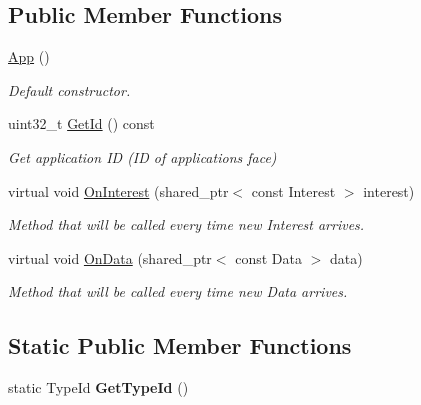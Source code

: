 \subsection*{Public Member Functions}
\begin{DoxyCompactItemize}
\item 
\hyperlink{classns3_1_1ndn_1_1App_aaedddf331628139511f33bdaef6cb7e7}{App} ()\hypertarget{classns3_1_1ndn_1_1App_aaedddf331628139511f33bdaef6cb7e7}{}\label{classns3_1_1ndn_1_1App_aaedddf331628139511f33bdaef6cb7e7}

\begin{DoxyCompactList}\small\item\em Default constructor. \end{DoxyCompactList}\item 
uint32\+\_\+t \hyperlink{classns3_1_1ndn_1_1App_a8fde2d80f8bb09b8e4a233ef733dc8e8}{Get\+Id} () const\hypertarget{classns3_1_1ndn_1_1App_a8fde2d80f8bb09b8e4a233ef733dc8e8}{}\label{classns3_1_1ndn_1_1App_a8fde2d80f8bb09b8e4a233ef733dc8e8}

\begin{DoxyCompactList}\small\item\em Get application ID (ID of applications face) \end{DoxyCompactList}\item 
virtual void \hyperlink{classns3_1_1ndn_1_1App_a7aab3dd5e62169430795a2d6e1060f95}{On\+Interest} (shared\+\_\+ptr$<$ const Interest $>$ interest)
\begin{DoxyCompactList}\small\item\em Method that will be called every time new Interest arrives. \end{DoxyCompactList}\item 
virtual void \hyperlink{classns3_1_1ndn_1_1App_a3f6f593a1557aa22c01bfbab6590b240}{On\+Data} (shared\+\_\+ptr$<$ const Data $>$ data)
\begin{DoxyCompactList}\small\item\em Method that will be called every time new Data arrives. \end{DoxyCompactList}\end{DoxyCompactItemize}
\subsection*{Static Public Member Functions}
\begin{DoxyCompactItemize}
\item 
static Type\+Id {\bfseries Get\+Type\+Id} ()\hypertarget{classns3_1_1ndn_1_1App_af25dc1439a11d24f04dc0946a4f6f316}{}\label{classns3_1_1ndn_1_1App_af25dc1439a11d24f04dc0946a4f6f316}

\end{DoxyCompactItemize}
